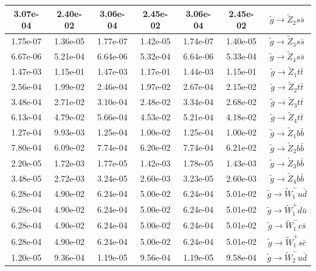 \documentclass[final,3p,times,pdflatex]{elsarticle}
\begin{document}
\begin{center}
\begin{table}
\begin{tabular}{|c|c|c|c|c|c|c|}
3.07e-04 & 2.40e-02 & 3.06e-04 & 2.45e-02 & 3.06e-04 & 2.45e-02 & $\tilde{g} \rightarrow \tilde{Z}_2 s \bar{s}$ \\ \hline
1.75e-07 & 1.36e-05 & 1.77e-07 & 1.42e-05 & 1.74e-07 & 1.40e-05 & $\tilde{g} \rightarrow \tilde{Z}_3 s \bar{s}$ \\ \hline
6.67e-06 & 5.21e-04 & 6.64e-06 & 5.32e-04 & 6.64e-06 & 5.33e-04  & $\tilde{g} \rightarrow \tilde{Z}_4 s \bar{s}$ \\ \hline
1.47e-03 & 1.15e-01 & 1.47e-03 & 1.17e-01 & 1.44e-03 & 1.15e-01 & $\tilde{g} \rightarrow \tilde{Z}_1 t \bar{t}$ \\ \hline
2.56e-04 & 1.99e-02 & 2.46e-04 & 1.97e-02 & 2.67e-04 & 2.15e-02 & $\tilde{g} \rightarrow \tilde{Z}_2 t \bar{t}$ \\ \hline
3.48e-04 & 2.71e-02 & 3.10e-04 & 2.48e-02 & 3.34e-04 & 2.68e-02 & $\tilde{g} \rightarrow \tilde{Z}_3 t \bar{t}$ \\ \hline
6.13e-04 & 4.79e-02 & 5.66e-04 & 4.53e-02 & 5.21e-04 & 4.18e-02 & $\tilde{g} \rightarrow \tilde{Z}_4 t \bar{t}$ \\ \hline
1.27e-04 & 9.93e-03 & 1.25e-04 & 1.00e-02 & 1.25e-04 & 1.00e-02 & $\tilde{g} \rightarrow \tilde{Z}_1 b \bar{b}$ \\ \hline
7.80e-04 & 6.09e-02 & 7.74e-04 & 6.20e-02 & 7.74e-04 & 6.21e-02 & $\tilde{g} \rightarrow \tilde{Z}_2 b \bar{b}$ \\ \hline
2.20e-05 & 1.72e-03 & 1.77e-05 & 1.42e-03 & 1.78e-05 & 1.43e-03 & $\tilde{g} \rightarrow \tilde{Z}_3 b \bar{b}$ \\ \hline
3.48e-05 & 2.72e-03 & 3.24e-05 & 2.60e-03 & 3.23e-05 & 2.60e-03 & $\tilde{g} \rightarrow \tilde{Z}_4 b \bar{b}$ \\ \hline
6.28e-04 & 4.90e-02 & 6.24e-04 & 5.00e-02 & 6.24e-04 & 5.01e-02 & $\tilde{g} \rightarrow \tilde{W}_1^- u \bar{d}$ \\ \hline
6.28e-04 & 4.90e-02 & 6.24e-04 & 5.00e-02 & 6.24e-04 & 5.01e-02 & $\tilde{g} \rightarrow \tilde{W}_1^+ d \bar{u}$ \\ \hline
6.28e-04 & 4.90e-02 & 6.24e-04 & 5.00e-02 & 6.24e-04 & 5.01e-02 & $\tilde{g} \rightarrow \tilde{W}_1^- c \bar{s}$ \\ \hline
6.28e-04 & 4.90e-02 & 6.24e-04 & 5.00e-02 & 6.24e-04 & 5.01e-02 & $\tilde{g} \rightarrow \tilde{W}_1^+ s \bar{c}$ \\ \hline
1.20e-05 & 9.36e-04 & 1.19e-05 & 9.56e-04 & 1.19e-05 & 9.58e-04 & $\tilde{g} \rightarrow \tilde{W}_2^- u \bar{d}$ \\ \hline

\end{tabular}
\end{table}
\end{center}
\end{document}
